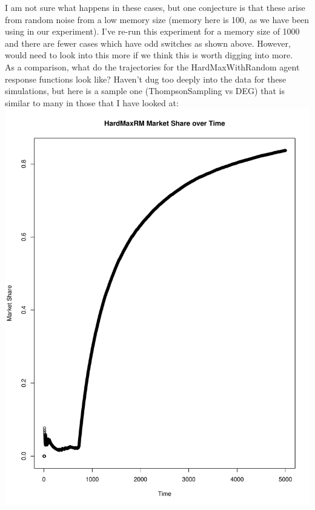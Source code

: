 \documentclass[11pt,letterpaper]{article}
\begin{document}
I am not sure what happens in these cases, but one conjecture is that these arise from random noise from a low memory size (memory here is 100, as we have been using in our experiment). I've re-run this experiment for a memory size of 1000 and there are fewer cases which have odd switches as shown above. However, would need to look into this more if we think this is worth digging into more.\\
As a comparison, what do the trajectories for the HardMaxWithRandom agent response functions look like? Haven't dug too deeply into the data for these simulations, but here is a sample one (ThompsonSampling vs DEG) that is similar to many in those that I have looked at: \\
\includegraphics[scale=0.25]{hmr_over_time} \\
\end{document}
